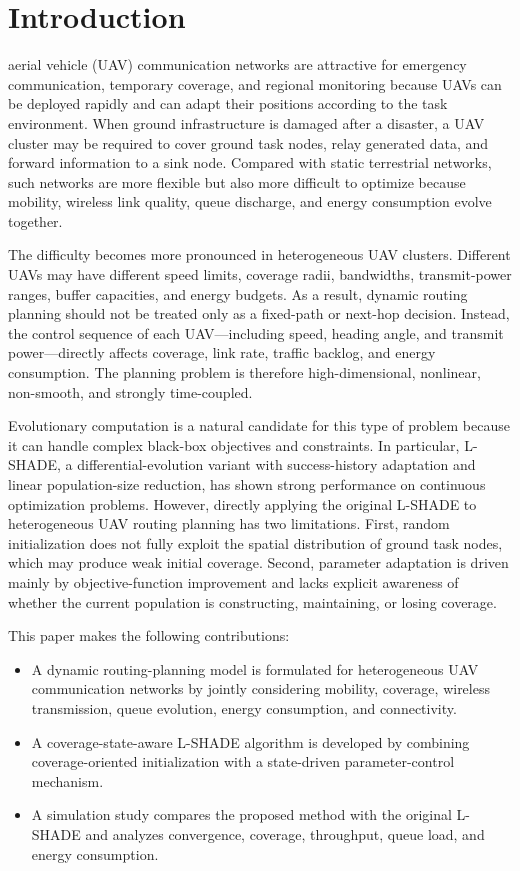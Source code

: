\documentclass[lettersize,journal]{IEEEtran}
\begin{document}
\section{Introduction}
 aerial vehicle (UAV) communication networks are attractive for emergency communication, temporary coverage, and regional monitoring because UAVs can be deployed rapidly and can adapt their positions according to the task environment. When ground infrastructure is damaged after a disaster, a UAV cluster may be required to cover ground task nodes, relay generated data, and forward information to a sink node. Compared with static terrestrial networks, such networks are more flexible but also more difficult to optimize because mobility, wireless link quality, queue discharge, and energy consumption evolve together.

The difficulty becomes more pronounced in heterogeneous UAV clusters. Different UAVs may have different speed limits, coverage radii, bandwidths, transmit-power ranges, buffer capacities, and energy budgets. As a result, dynamic routing planning should not be treated only as a fixed-path or next-hop decision. Instead, the control sequence of each UAV---including speed, heading angle, and transmit power---directly affects coverage, link rate, traffic backlog, and energy consumption. The planning problem is therefore high-dimensional, nonlinear, non-smooth, and strongly time-coupled.

Evolutionary computation is a natural candidate for this type of problem because it can handle complex black-box objectives and constraints. In particular, L-SHADE, a differential-evolution variant with success-history adaptation and linear population-size reduction, has shown strong performance on continuous optimization problems. However, directly applying the original L-SHADE to heterogeneous UAV routing planning has two limitations. First, random initialization does not fully exploit the spatial distribution of ground task nodes, which may produce weak initial coverage. Second, parameter adaptation is driven mainly by objective-function improvement and lacks explicit awareness of whether the current population is constructing, maintaining, or losing coverage.

This paper makes the following contributions:
\begin{itemize}
  \item A dynamic routing-planning model is formulated for heterogeneous UAV communication networks by jointly considering mobility, coverage, wireless transmission, queue evolution, energy consumption, and connectivity.
  \item A coverage-state-aware L-SHADE algorithm is developed by combining coverage-oriented initialization with a state-driven parameter-control mechanism.
  \item A simulation study compares the proposed method with the original L-SHADE and analyzes convergence, coverage, throughput, queue load, and energy consumption.
\end{itemize}
\end{document}
